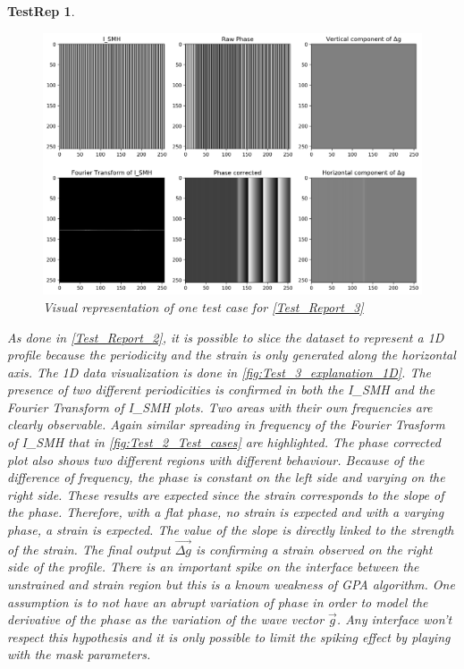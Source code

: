 \documentclass[12pt, titlepage]{article}
\newtheorem{TestRep}{TestRep}
\begin{document}
\begin{TestRep}
\begin{figure}[H]
\begin{center}
\includegraphics[scale=0.5]{Figures/Test_3_explanation.png}
\caption{Visual representation of one test case for \cref{Test_Report_3}}
\label{fig:Test_3_explanation}
\end{center}
\end{figure}

As done in \cref{Test_Report_2}, it is possible to slice the dataset to 
represent a 1D profile because the periodicity and the strain is only generated 
along the horizontal axis. The 1D data visualization is done in 
\cref{fig:Test_3_explanation_1D}. The presence of two different periodicities is 
confirmed in both the I{\_}SMH and the Fourier Transform of I{\_}SMH plots. Two 
areas with their own frequencies are clearly observable. Again similar spreading 
in frequency of the Fourier Trasform of I{\_}SMH that in 
\cref{fig:Test_2_Test_cases} are highlighted. The phase corrected plot also 
shows two different regions with different behaviour. Because of the difference 
of frequency, the phase is constant on the left side and varying on the right 
side. These results are expected since the strain corresponds to the slope of 
the phase. Therefore, with a flat phase, no strain is expected and with a 
varying phase, a strain is expected. The value of the slope is directly linked 
to the strength of the strain. The final output $\overrightarrow{\Delta g}$ is 
confirming a strain observed on the right side of the profile. There is an 
important spike on the interface between the unstrained and strain region but 
this is a known weakness of GPA algorithm. One assumption is to not have an 
abrupt variation of phase in order to model the derivative of the phase as the 
variation of the wave vector $\overrightarrow{g}$. Any interface won't respect 
this hypothesis and it is only possible to limit the spiking effect by playing 
with the mask parameters.


\end{TestRep}
\end{document}
